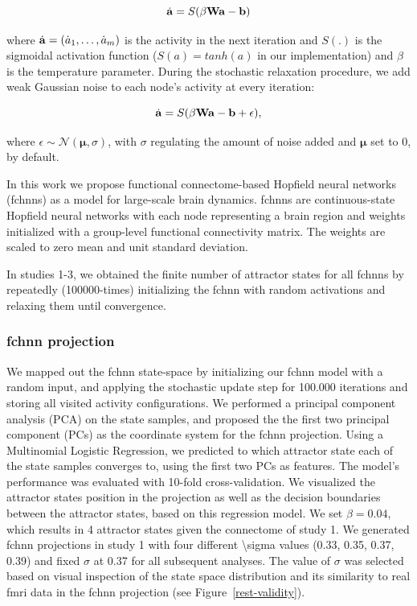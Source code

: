 \documentclass{article}
\begin{document}
\begin{equation}
\label{hopfield-update-matrix}
\dot{\bold{a}} = S(\beta \bold{W} \bold{a} - \bold{b})
\end{equation}

where $\dot{\bold{a}} = (\dot{a}_1, \dots, \dot{a}_m)$ is the activity in the next iteration and $S(.)$ is the sigmoidal activation function ($S(a) = tanh(a)$ in our implementation) and $\beta$ is the temperature parameter.
During the stochastic relaxation procedure, we add weak Gaussian noise to each node's activity at every iteration:

\begin{equation}
\label{hopfield-update-matrix-stochastic}
\dot{\bold{a}} = S(\beta \bold{W} \bold{a} - \bold{b}  + \epsilon),
\end{equation}

where $\epsilon \sim \mathcal{N}(\mathbf{\mu}, \sigma)$, with $\sigma$ regulating the amount of noise added and $\mathbf{\mu}$ set to 0, by default.

In this work we propose functional connectome-based Hopfield neural networks (\acrshort{fchnn}s) as a model for large-scale brain dynamics. \acrshort{fchnn}s are continuous-state Hopfield neural networks with each node representing a brain region and weights initialized with a group-level functional connectivity matrix. The weights are scaled to zero mean and unit standard deviation.

In studies 1-3, we obtained the finite number of attractor states for all \acrshort{fchnn}s by repeate\acrshort{dl}y (100000-times) initializing the \acrshort{fchnn} with random activations and relaxing them until convergence.

\subsubsection{\acrshort{fchnn} projection}\label{fcHNN projection}

We mapped out the \acrshort{fchnn} state-space by initializing our \acrshort{fchnn} model with a random input, and applying the stochastic update step for 100.000 iterations and storing all visited activity configurations.
We performed a principal component analysis (PCA) on the state samples, and proposed the the first two principal  component (PCs) as the coordinate system for the \acrshort{fchnn} projection. Using a Multinomial Logistic Regression, we predicted to which attractor state each of the state samples converges to, using the first two PCs as features. The model's performance was evaluated with 10-fold cross-validation. We visualized the attractor states position in the projection as well as the decision boundaries between the attractor states, based on this regression model. We set $\beta = 0.04$, which results in 4 attractor states given the connectome of study 1. We  generated \acrshort{fchnn} projections in study 1 with four different {\textbackslash}sigma values (0.33, 0.35, 0.37, 0.39) and fixed $\sigma$ at 0.37 for all subsequent analyses. The value of $\sigma$ was selected based on visual inspection of the state space distribution and its similarity to real \acrshort{fmri} data in the \acrshort{fchnn} projection (see Figure~\ref{rest-validity}).
\end{document}
